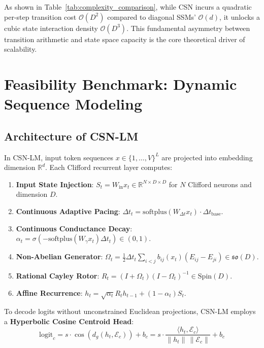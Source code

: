 \documentclass[11pt,a4paper]{article}
\begin{document}
As shown in Table~\ref{tab:complexity_comparison}, while CSN incurs a quadratic per-step transition cost $\mathcal{O}(D^2)$ compared to diagonal SSMs' $\mathcal{O}(d)$, it unlocks a cubic state interaction density $\mathcal{O}(D^3)$. This fundamental asymmetry between transition arithmetic and state space capacity is the core theoretical driver of scalability.

\section{Feasibility Benchmark: Dynamic Sequence Modeling}

\subsection{Architecture of CSN-LM}

In CSN-LM, input token sequences $x \in \{1, \dots, V\}^L$ are projected into embedding dimension $\mathbb{R}^{d}$. Each Clifford recurrent layer computes:
\begin{enumerate}[leftmargin=*]
    \item \textbf{Input State Injection}: $S_t = W_{\text{in}} x_t \in \mathbb{R}^{N \times D \times D}$ for $N$ Clifford neurons and dimension $D$.
    \item \textbf{Continuous Adaptive Pacing}: $\Delta t_t = \mathrm{softplus}(W_{\Delta t} x_t) \cdot \Delta t_{\mathrm{base}}$.
    \item \textbf{Continuous Conductance Decay}: $\alpha_t = \sigma(-\mathrm{softplus}(W_\gamma x_t) \Delta t_t) \in (0, 1)$.
    \item \textbf{Non-Abelian Generator}: $\Omega_t = \frac{1}{2} \Delta t_t \sum_{i < j} b_{ij}(x_t) (E_{ij} - E_{ji}) \in \mathfrak{so}(D)$.
    \item \textbf{Rational Cayley Rotor}: $R_t = (I + \Omega_t)(I - \Omega_t)^{-1} \in \mathrm{Spin}(D)$.
    \item \textbf{Affine Recurrence}: $h_t = \sqrt{\alpha_t} R_t h_{t-1} + (1 - \alpha_t) S_t$.
\end{enumerate}

To decode logits without unconstrained Euclidean projections, CSN-LM employs a \textbf{Hyperbolic Cosine Centroid Head}:
\begin{equation}
    \mathrm{logit}_c = s \cdot \cos\left(d_g(h_t, \mathcal{E}_c)\right) + b_c = s \cdot \frac{\langle h_t, \mathcal{E}_c \rangle}{\|h_t\| \, \|\mathcal{E}_c\|} + b_c
\end{equation}
\end{document}
